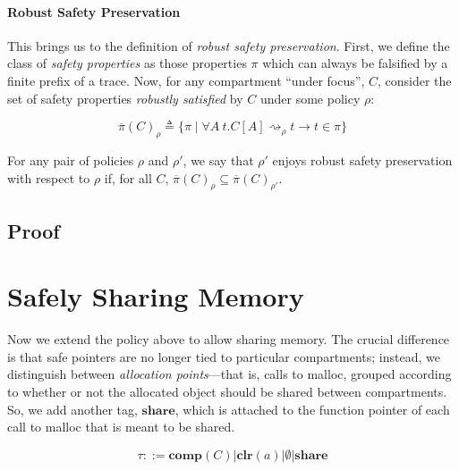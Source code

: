 \documentclass{article}
\begin{document}

\paragraph{Robust Safety Preservation}

This brings us to the definition of {\em robust safety preservation}. First, we define the
class of {\em safety properties} as those properties \(\pi\) which can always be falsified by
a finite prefix of a trace. Now, for any compartment ``under focus'', \(C\), consider the set
of safety properties {\em robustly satisfied} by \(C\) under some policy \(\rho\):

\[\overline{\pi}(C)_\rho \triangleq \{ \pi \mid \forall A ~ t .
C[A] \rightsquigarrow_\rho t \rightarrow t \in \pi \}\]

For any pair of policies \(\rho\) and \(\rho'\), we say that \(\rho'\) enjoys robust
safety preservation with respect to \(\rho\) if, for all \(C\),
\(\overline{\pi}(C)_\rho \subseteq \overline{\pi}(C)_{\rho'}\).

\subsection{Proof}

\section{Safely Sharing Memory}

Now we extend the policy above to allow sharing memory. The crucial difference is that
safe pointers are no longer tied to particular compartments; instead, we distinguish
between {\it allocation points}---that is, calls to malloc, grouped according to
whether or not the allocated object should be shared between compartments.
So, we add another tag, \(\mathbf{share}\), which is attached to the function pointer
of each call to malloc that is meant to be shared.

\[\tau ::= \mathbf{comp}(C) | \mathbf{clr}(a) | \emptyset | \mathbf{share} \]
\end{document}
